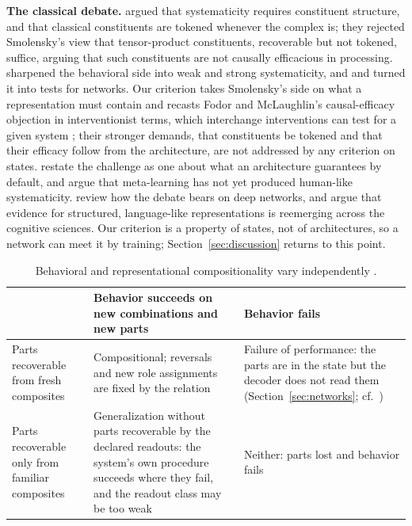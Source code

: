 \documentclass[10pt]{article}
\theoremstyle{plain}
\theoremstyle{remark}
\begin{document}
\textbf{The classical debate.} \citet{fodor1988} argued that systematicity requires constituent structure, and \citet{fodor1990} that classical constituents are tokened whenever the complex is; they rejected Smolensky's view \citep{smolensky1987,smolensky1988,smolensky1990} that tensor-product constituents, recoverable but not tokened, suffice, arguing that such constituents are not causally efficacious in processing. \citet{hadley1994} sharpened the behavioral side into weak and strong systematicity, and \citet{hupkes2020} and \citet{vegner2025} turned it into tests for networks. Our criterion takes Smolensky's side on what a representation must contain and recasts Fodor and McLaughlin's causal-efficacy objection in interventionist terms, which interchange interventions can test for a given system \citep{geiger2021}; their stronger demands, that constituents be tokened and that their efficacy follow from the architecture, are not addressed by any criterion on states. \citet{goodale2026} restate the challenge as one about what an architecture guarantees by default, and \citet{woydt2025} argue that meta-learning \citep{lake2023} has not yet produced human-like systematicity. \citet{russin2024} review how the debate bears on deep networks, and \citet{quiltydunn2023} argue that evidence for structured, language-like representations is reemerging across the cognitive sciences. Our criterion is a property of states, not of architectures, so a network can meet it by training; Section~\ref{sec:discussion} returns to this point.

\begin{table}[t]
  \caption{Behavioral and representational compositionality vary independently \citep[cf.][]{vegner2025}.}
  \label{tab:twobytwo}
  \centering\small
  \begin{tabularx}{\linewidth}{@{}P{3.2cm}YY@{}}
    \toprule
    & Behavior succeeds on new combinations and new parts & Behavior fails \\
    \midrule
    Parts recoverable from fresh composites & Compositional; reversals and new role assignments are fixed by the relation & Failure of performance: the parts are in the state but the decoder does not read them (Section~\ref{sec:networks}; cf.\ \citealt{montero2021,park2024hidden}) \\
    Parts recoverable only from familiar composites & Generalization without parts recoverable by the declared readouts: the system's own procedure succeeds where they fail, and the readout class may be too weak & Neither: parts lost and behavior fails \\
    \bottomrule
  \end{tabularx}
\end{table}
\end{document}
